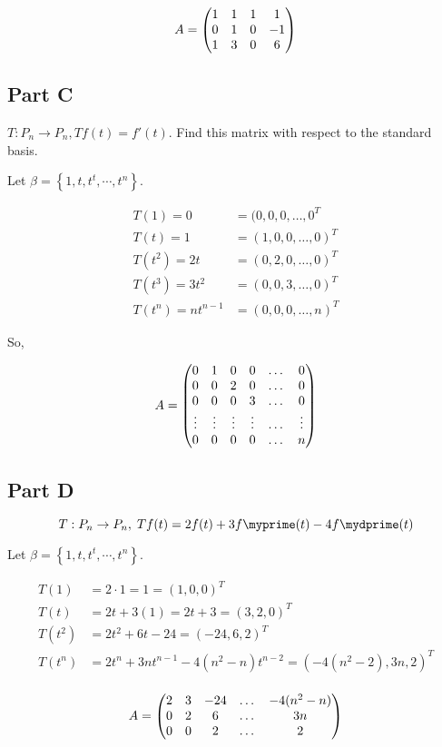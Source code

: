 \[A = \genericmat{p}{1&1&1&1\\0&1&0&-1\\1&3&0&6}\]

\subsection*{Part C}

$T: P_n \to P_n, Tf(t) = f'(t)$. Find this matrix with respect to the standard basis. 

Let $\beta = \left\{ 1, t, t^t, \cdots, t^n \right\}$.

\[
	\begin{aligned}
		T(1) = 0 &= (0,0,0, \dots , 0^T \\
			T(t) = 1 &= (1,0,0, \dots, 0)^T \\
			T(t^2) = 2t &= (0,2,0, \dots , 0)^T \\
			T(t^3) = 3t^2 &= (0,0,3, \dots,  0)^T \\
			T(t^n) = nt^{n-1} &= (0,0,0, \dots,  n)^T 
	\end{aligned}
\]

So,

\[
	A = \genericmat{p}{
		0&1&0&0& \dots & 0 \\
		0&0&2&0& \dots & 0 \\
		0&0&0&3& \dots & 0 \\
		\vdots & \vdots & \vdots & \vdots & \dots & \vdots \\
		0&0&0&0& \dots & n \\
	}
\]

\subsection*{Part D}
\[T: P_n \to P_n,\; Tf(t) = 2f(t) + 3f \myprime (t) - 4f \mydprime (t)\]

Let $\beta = \left\{ 1, t, t^t, \cdots, t^n \right\}$.

\[
	\begin{aligned}
		T(1) &= 2 \cdot 1 = 1 = \boxed{(1,0,0)^T} \\
		T(t) &= 2t + 3(1) = 2t + 3 = \boxed{(3,2,0)^T} \\
		T(t^2) &= 2t^2 + 6t - 24 = \boxed{(-24,6,2)^T} \\
		T(t^n) &= 2t^n + 3nt^{n-1} - 4(n^2-n)t^{n-2} = \boxed{(-4(n^2-2),3n,2)^T} \\
	\end{aligned}
\]

\[
A = 
\genericmat{p}
{
	2&3&-24&\dots&-4(n^2-n)\\
	0&2&6&\dots&3n\\
	0&0&2&\dots&2
}
\]
